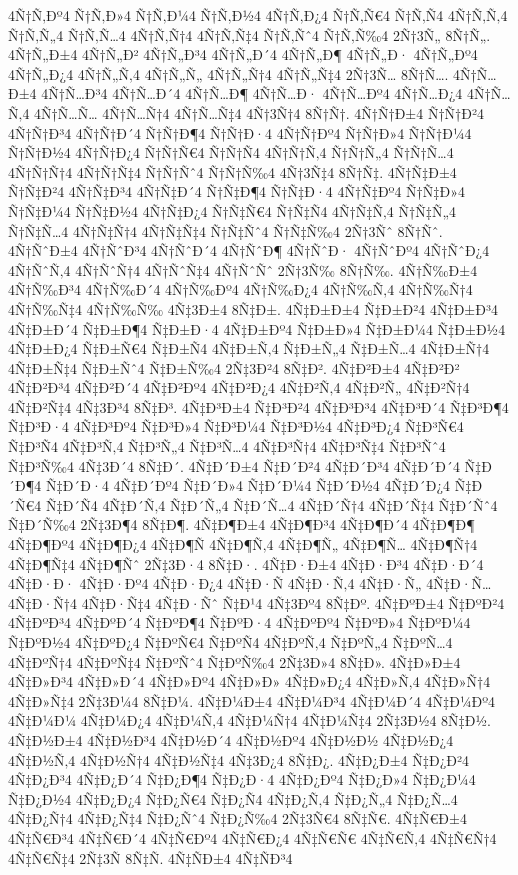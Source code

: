 {4Ñ†Ñ‚Ðº4
Ñ†Ñ‚Ð»4
Ñ†Ñ‚Ð¼4
Ñ†Ñ‚Ð½4
4Ñ†Ñ‚Ð¿4
Ñ†Ñ‚Ñ€4
Ñ†Ñ‚Ñ4
4Ñ†Ñ‚Ñ‚4
Ñ†Ñ‚Ñ„4
Ñ†Ñ‚Ñ…4
4Ñ†Ñ‚Ñ†4
4Ñ†Ñ‚Ñ‡4
Ñ†Ñ‚Ñˆ4
Ñ†Ñ‚Ñ‰4
2Ñ†3Ñ„
8Ñ†Ñ„.
4Ñ†Ñ„Ð±4
4Ñ†Ñ„Ð²
4Ñ†Ñ„Ð³4
4Ñ†Ñ„Ð´4
4Ñ†Ñ„Ð¶
4Ñ†Ñ„Ð·
4Ñ†Ñ„Ðº4
4Ñ†Ñ„Ð¿4
4Ñ†Ñ„Ñ‚4
4Ñ†Ñ„Ñ„
4Ñ†Ñ„Ñ†4
4Ñ†Ñ„Ñ‡4
2Ñ†3Ñ…
8Ñ†Ñ….
4Ñ†Ñ…Ð±4
4Ñ†Ñ…Ð³4
4Ñ†Ñ…Ð´4
4Ñ†Ñ…Ð¶
4Ñ†Ñ…Ð·
4Ñ†Ñ…Ðº4
4Ñ†Ñ…Ð¿4
4Ñ†Ñ…Ñ‚4
4Ñ†Ñ…Ñ…
4Ñ†Ñ…Ñ†4
4Ñ†Ñ…Ñ‡4
4Ñ†3Ñ†4
8Ñ†Ñ†.
4Ñ†Ñ†Ð±4
Ñ†Ñ†Ð²4
4Ñ†Ñ†Ð³4
4Ñ†Ñ†Ð´4
Ñ†Ñ†Ð¶4
Ñ†Ñ†Ð·4
4Ñ†Ñ†Ðº4
Ñ†Ñ†Ð»4
Ñ†Ñ†Ð¼4
Ñ†Ñ†Ð½4
4Ñ†Ñ†Ð¿4
Ñ†Ñ†Ñ€4
Ñ†Ñ†Ñ4
4Ñ†Ñ†Ñ‚4
Ñ†Ñ†Ñ„4
Ñ†Ñ†Ñ…4
4Ñ†Ñ†Ñ†4
4Ñ†Ñ†Ñ‡4
Ñ†Ñ†Ñˆ4
Ñ†Ñ†Ñ‰4
4Ñ†3Ñ‡4
8Ñ†Ñ‡.
4Ñ†Ñ‡Ð±4
Ñ†Ñ‡Ð²4
4Ñ†Ñ‡Ð³4
4Ñ†Ñ‡Ð´4
Ñ†Ñ‡Ð¶4
Ñ†Ñ‡Ð·4
4Ñ†Ñ‡Ðº4
Ñ†Ñ‡Ð»4
Ñ†Ñ‡Ð¼4
Ñ†Ñ‡Ð½4
4Ñ†Ñ‡Ð¿4
Ñ†Ñ‡Ñ€4
Ñ†Ñ‡Ñ4
4Ñ†Ñ‡Ñ‚4
Ñ†Ñ‡Ñ„4
Ñ†Ñ‡Ñ…4
4Ñ†Ñ‡Ñ†4
4Ñ†Ñ‡Ñ‡4
Ñ†Ñ‡Ñˆ4
Ñ†Ñ‡Ñ‰4
2Ñ†3Ñˆ
8Ñ†Ñˆ.
4Ñ†ÑˆÐ±4
4Ñ†ÑˆÐ³4
4Ñ†ÑˆÐ´4
4Ñ†ÑˆÐ¶
4Ñ†ÑˆÐ·
4Ñ†ÑˆÐº4
4Ñ†ÑˆÐ¿4
4Ñ†ÑˆÑ‚4
4Ñ†ÑˆÑ†4
4Ñ†ÑˆÑ‡4
4Ñ†ÑˆÑˆ
2Ñ†3Ñ‰
8Ñ†Ñ‰.
4Ñ†Ñ‰Ð±4
4Ñ†Ñ‰Ð³4
4Ñ†Ñ‰Ð´4
4Ñ†Ñ‰Ðº4
4Ñ†Ñ‰Ð¿4
4Ñ†Ñ‰Ñ‚4
4Ñ†Ñ‰Ñ†4
4Ñ†Ñ‰Ñ‡4
4Ñ†Ñ‰Ñ‰
4Ñ‡3Ð±4
8Ñ‡Ð±.
4Ñ‡Ð±Ð±4
Ñ‡Ð±Ð²4
4Ñ‡Ð±Ð³4
4Ñ‡Ð±Ð´4
Ñ‡Ð±Ð¶4
Ñ‡Ð±Ð·4
4Ñ‡Ð±Ðº4
Ñ‡Ð±Ð»4
Ñ‡Ð±Ð¼4
Ñ‡Ð±Ð½4
4Ñ‡Ð±Ð¿4
Ñ‡Ð±Ñ€4
Ñ‡Ð±Ñ4
4Ñ‡Ð±Ñ‚4
Ñ‡Ð±Ñ„4
Ñ‡Ð±Ñ…4
4Ñ‡Ð±Ñ†4
4Ñ‡Ð±Ñ‡4
Ñ‡Ð±Ñˆ4
Ñ‡Ð±Ñ‰4
2Ñ‡3Ð²4
8Ñ‡Ð².
4Ñ‡Ð²Ð±4
4Ñ‡Ð²Ð²
4Ñ‡Ð²Ð³4
4Ñ‡Ð²Ð´4
4Ñ‡Ð²Ðº4
4Ñ‡Ð²Ð¿4
4Ñ‡Ð²Ñ‚4
4Ñ‡Ð²Ñ„
4Ñ‡Ð²Ñ†4
4Ñ‡Ð²Ñ‡4
4Ñ‡3Ð³4
8Ñ‡Ð³.
4Ñ‡Ð³Ð±4
Ñ‡Ð³Ð²4
4Ñ‡Ð³Ð³4
4Ñ‡Ð³Ð´4
Ñ‡Ð³Ð¶4
Ñ‡Ð³Ð·4
4Ñ‡Ð³Ðº4
Ñ‡Ð³Ð»4
Ñ‡Ð³Ð¼4
Ñ‡Ð³Ð½4
4Ñ‡Ð³Ð¿4
Ñ‡Ð³Ñ€4
Ñ‡Ð³Ñ4
4Ñ‡Ð³Ñ‚4
Ñ‡Ð³Ñ„4
Ñ‡Ð³Ñ…4
4Ñ‡Ð³Ñ†4
4Ñ‡Ð³Ñ‡4
Ñ‡Ð³Ñˆ4
Ñ‡Ð³Ñ‰4
4Ñ‡3Ð´4
8Ñ‡Ð´.
4Ñ‡Ð´Ð±4
Ñ‡Ð´Ð²4
4Ñ‡Ð´Ð³4
4Ñ‡Ð´Ð´4
Ñ‡Ð´Ð¶4
Ñ‡Ð´Ð·4
4Ñ‡Ð´Ðº4
Ñ‡Ð´Ð»4
Ñ‡Ð´Ð¼4
Ñ‡Ð´Ð½4
4Ñ‡Ð´Ð¿4
Ñ‡Ð´Ñ€4
Ñ‡Ð´Ñ4
4Ñ‡Ð´Ñ‚4
Ñ‡Ð´Ñ„4
Ñ‡Ð´Ñ…4
4Ñ‡Ð´Ñ†4
4Ñ‡Ð´Ñ‡4
Ñ‡Ð´Ñˆ4
Ñ‡Ð´Ñ‰4
2Ñ‡3Ð¶4
8Ñ‡Ð¶.
4Ñ‡Ð¶Ð±4
4Ñ‡Ð¶Ð³4
4Ñ‡Ð¶Ð´4
4Ñ‡Ð¶Ð¶
4Ñ‡Ð¶Ðº4
4Ñ‡Ð¶Ð¿4
4Ñ‡Ð¶Ñ
4Ñ‡Ð¶Ñ‚4
4Ñ‡Ð¶Ñ„
4Ñ‡Ð¶Ñ…
4Ñ‡Ð¶Ñ†4
4Ñ‡Ð¶Ñ‡4
4Ñ‡Ð¶Ñˆ
2Ñ‡3Ð·4
8Ñ‡Ð·.
4Ñ‡Ð·Ð±4
4Ñ‡Ð·Ð³4
4Ñ‡Ð·Ð´4
4Ñ‡Ð·Ð·
4Ñ‡Ð·Ðº4
4Ñ‡Ð·Ð¿4
4Ñ‡Ð·Ñ
4Ñ‡Ð·Ñ‚4
4Ñ‡Ð·Ñ„
4Ñ‡Ð·Ñ…
4Ñ‡Ð·Ñ†4
4Ñ‡Ð·Ñ‡4
4Ñ‡Ð·Ñˆ
Ñ‡Ð¹4
4Ñ‡3Ðº4
8Ñ‡Ðº.
4Ñ‡ÐºÐ±4
Ñ‡ÐºÐ²4
4Ñ‡ÐºÐ³4
4Ñ‡ÐºÐ´4
Ñ‡ÐºÐ¶4
Ñ‡ÐºÐ·4
4Ñ‡ÐºÐº4
Ñ‡ÐºÐ»4
Ñ‡ÐºÐ¼4
Ñ‡ÐºÐ½4
4Ñ‡ÐºÐ¿4
Ñ‡ÐºÑ€4
Ñ‡ÐºÑ4
4Ñ‡ÐºÑ‚4
Ñ‡ÐºÑ„4
Ñ‡ÐºÑ…4
4Ñ‡ÐºÑ†4
4Ñ‡ÐºÑ‡4
Ñ‡ÐºÑˆ4
Ñ‡ÐºÑ‰4
2Ñ‡3Ð»4
8Ñ‡Ð».
4Ñ‡Ð»Ð±4
4Ñ‡Ð»Ð³4
4Ñ‡Ð»Ð´4
4Ñ‡Ð»Ðº4
4Ñ‡Ð»Ð»
4Ñ‡Ð»Ð¿4
4Ñ‡Ð»Ñ‚4
4Ñ‡Ð»Ñ†4
4Ñ‡Ð»Ñ‡4
2Ñ‡3Ð¼4
8Ñ‡Ð¼.
4Ñ‡Ð¼Ð±4
4Ñ‡Ð¼Ð³4
4Ñ‡Ð¼Ð´4
4Ñ‡Ð¼Ðº4
4Ñ‡Ð¼Ð¼
4Ñ‡Ð¼Ð¿4
4Ñ‡Ð¼Ñ‚4
4Ñ‡Ð¼Ñ†4
4Ñ‡Ð¼Ñ‡4
2Ñ‡3Ð½4
8Ñ‡Ð½.
4Ñ‡Ð½Ð±4
4Ñ‡Ð½Ð³4
4Ñ‡Ð½Ð´4
4Ñ‡Ð½Ðº4
4Ñ‡Ð½Ð½
4Ñ‡Ð½Ð¿4
4Ñ‡Ð½Ñ‚4
4Ñ‡Ð½Ñ†4
4Ñ‡Ð½Ñ‡4
4Ñ‡3Ð¿4
8Ñ‡Ð¿.
4Ñ‡Ð¿Ð±4
Ñ‡Ð¿Ð²4
4Ñ‡Ð¿Ð³4
4Ñ‡Ð¿Ð´4
Ñ‡Ð¿Ð¶4
Ñ‡Ð¿Ð·4
4Ñ‡Ð¿Ðº4
Ñ‡Ð¿Ð»4
Ñ‡Ð¿Ð¼4
Ñ‡Ð¿Ð½4
4Ñ‡Ð¿Ð¿4
Ñ‡Ð¿Ñ€4
Ñ‡Ð¿Ñ4
4Ñ‡Ð¿Ñ‚4
Ñ‡Ð¿Ñ„4
Ñ‡Ð¿Ñ…4
4Ñ‡Ð¿Ñ†4
4Ñ‡Ð¿Ñ‡4
Ñ‡Ð¿Ñˆ4
Ñ‡Ð¿Ñ‰4
2Ñ‡3Ñ€4
8Ñ‡Ñ€.
4Ñ‡Ñ€Ð±4
4Ñ‡Ñ€Ð³4
4Ñ‡Ñ€Ð´4
4Ñ‡Ñ€Ðº4
4Ñ‡Ñ€Ð¿4
4Ñ‡Ñ€Ñ€
4Ñ‡Ñ€Ñ‚4
4Ñ‡Ñ€Ñ†4
4Ñ‡Ñ€Ñ‡4
2Ñ‡3Ñ
8Ñ‡Ñ.
4Ñ‡ÑÐ±4
4Ñ‡ÑÐ³4
}
